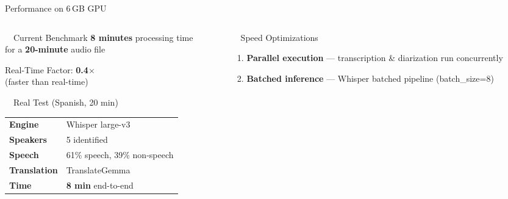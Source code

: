 \documentclass[aspectratio=169, 11pt]{beamer}
\begin{document}
\begin{frame}{Performance on 6\,GB GPU}
    \begin{columns}[T]
        \begin{column}{0.48\textwidth}
            \begin{exampleblock}{\faStopwatch\ \ Current Benchmark}
                \centering
                \vspace{0.3em}
                {\Large\bfseries 8 minutes} processing time\\[3pt]
                for a \textbf{20-minute} audio file\\[4pt]
                \colorbox{pipegreen!15}{\parbox{0.8\linewidth}{\centering
                    \small Real-Time Factor: \textbf{0.4$\times$}\\[-1pt]
                    \scriptsize(faster than real-time)
                }}
                \vspace{0.3em}
            \end{exampleblock}
            \vspace{0.2em}
            \begin{block}{\faFlask\ \ Real Test (Spanish, 20 min)}
                \scriptsize
                \renewcommand{\arraystretch}{1.1}
                \begin{tabular}{@{}l l@{}}
                    \textbf{Engine} & Whisper large-v3 \\
                    \textbf{Speakers} & 5 identified \\
                    \textbf{Speech} & 61\% speech, 39\% non-speech \\
                    \textbf{Translation} & TranslateGemma \\
                    \textbf{Time} & \textbf{8 min} end-to-end \\
                \end{tabular}
            \end{block}
        \end{column}
        \begin{column}{0.48\textwidth}
            \begin{block}{\faRocket\ \ Speed Optimizations}
                \scriptsize
                \begin{enumerate}
                    \item \textbf{Parallel execution} --- transcription \& diarization run concurrently
                    \item \textbf{Batched inference} --- Whisper batched pipeline (batch\_size=8)

\end{enumerate}
\end{block}
\end{column}
\end{columns}
\end{frame}
\end{document}
